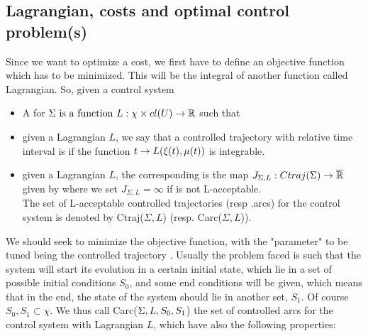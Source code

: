 \subsection{Lagrangian, costs and optimal control problem(s)}
Since we want to optimize a cost, we first have to define an objective function which has to be minimized. This will be the integral of another function called Lagrangian. So, given a control system \controlSystem
\begin{itemize}
	\item A  for $\Sigma\text{ is a function }L:\chi\times cl(U)\rightarrow\mathbb{R}$ such that
	
	\item given a Lagrangian $L$, we say that a controlled trajectory \controlledTrajSpaced with relative time interval \I is  if the function $t\rightarrow L(\xi (t),\mu(t))$ is integrable.
	
	\item given a Lagrangian $L$, the corresponding  is the map $J_{\Sigma,L}:Ctraj(\Sigma)\rightarrow\overline{\mathbb{R}}$ given by 
	where we set $J_{\Sigma,L}=\infty$ if \controlledTrajSpaced is not L-acceptable.\\
	The set of L-acceptable controlled trajectories (resp .arcs) for the control system is denoted by Ctraj($\Sigma,L$) (resp. Carc($\Sigma,L$)).
\end{itemize}

We should seek to minimize the objective function, with the "parameter" to be tuned being the controlled trajectory \controlledTraj. Usually the problem faced is such that the system will start its evolution in a certain initial state, which lie in a set of possible initial conditions $S_0$, and some end conditions will be given, which means that in the end, the state of the system should lie in another set, $S_1$. Of course $S_0,S_1\subset\chi$. We thus call Carc($\Sigma,L,S_0,S_1$) the set of controlled arcs for the control system \controlSystemSpaced with Lagrangian $L$, which have also the following properties:

